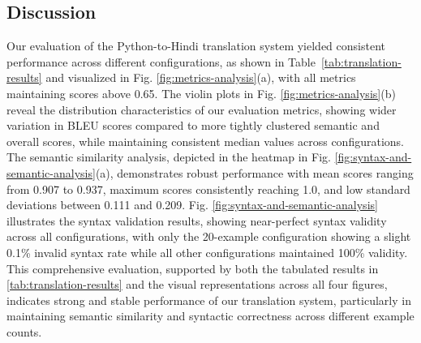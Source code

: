 \documentclass[11pt,a4paper]{article}
\begin{document}
\subsection{Discussion}
Our evaluation of the Python-to-Hindi translation system yielded consistent performance across different configurations, as shown in Table~\ref{tab:translation-results} and visualized in Fig. \ref{fig:metrics-analysis}(a), with all metrics maintaining scores above 0.65. The violin plots in Fig.  \ref{fig:metrics-analysis}(b) reveal the distribution characteristics of our evaluation metrics, showing wider variation in BLEU scores compared to more tightly clustered semantic and overall scores, while maintaining consistent median values across configurations. The semantic similarity analysis, depicted in the heatmap in Fig. \ref{fig:syntax-and-semantic-analysis}(a), demonstrates robust performance with mean scores ranging from 0.907 to 0.937, maximum scores consistently reaching 1.0, and low standard deviations between 0.111 and 0.209. Fig. \ref{fig:syntax-and-semantic-analysis} illustrates the syntax validation results, showing near-perfect syntax validity across all configurations, with only the 20-example configuration showing a slight 0.1\% invalid syntax rate while all other configurations maintained 100\% validity. This comprehensive evaluation, supported by both the tabulated results in \ref{tab:translation-results} and the visual representations across all four figures, indicates strong and stable performance of our translation system, particularly in maintaining semantic similarity and syntactic correctness across different example counts.
\end{document}
